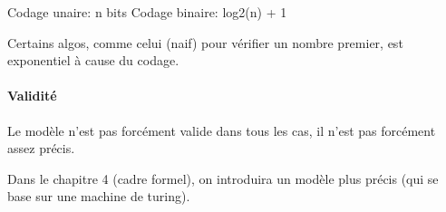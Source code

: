 Codage unaire: n bits Codage binaire: log2(n) + 1

Certains algos, comme celui (naif) pour vérifier un nombre premier, est
exponentiel à cause du codage.

\hypertarget{validituxe9}{%
\paragraph{Validité}\label{validituxe9}}

Le modèle n'est pas forcément valide dans tous les cas, il n'est pas
forcément assez précis.

Dans le chapitre 4 (cadre formel), on introduira un modèle plus précis
(qui se base sur une machine de turing).
